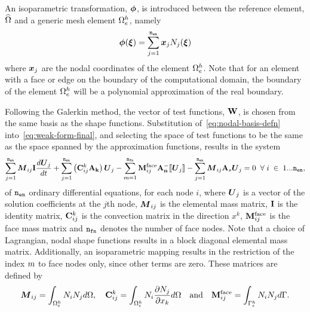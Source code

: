 An isoparametric transformation, $\boldsymbol{\phi}$, is introduced between the reference element, $\widehat{\Omega}$ and a generic mesh element $\Omega_e^{h}$, namely
\begin{equation} \label{eq:isoparametricMapping}
\boldsymbol{\phi}(\boldsymbol{\xi}) = \sum_{j=1}^{\texttt{n}_{\texttt{en}}} \boldsymbol{x}_j N_j(\boldsymbol{\xi})
\end{equation}
where $\boldsymbol{x}_j$ are the nodal coordinates of the element $\Omega_e^{h}$. Note that for an element with a face or edge on the boundary of the computational domain, the boundary of the element $\Omega_e^{h}$ will be a polynomial approximation of the real boundary\cite{ComparisonCurvedFEs}.

 Following the Galerkin method, the vector of test functions, $\mathbf{W}$, is chosen from the same basis as the shape functions. Substitution of~\eqref{eq:nodal-basis-defn} into~\eqref{eq:weak-form-final}, and selecting the space of test functions to be the same as the space spanned by the approximation functions, results in the system
 \begin{equation}
\sum_{j=1}^{\texttt{n}_{\texttt{en}}} \boldsymbol{M}_{ij} \mathbf{I} \frac{d \boldsymbol{U}_j}{d t} + \sum_{j=1}^{\texttt{n}_{\texttt{en}}} \left( \mathbf{C}^{k}_{ij} \mathbf{A}_\mathbf{k} \right) \boldsymbol{U}_j - \sum_{m=1}^{\texttt{n}_{\texttt{fn}}} \mathbf{M}^{\textrm{face}}_{ij} \mathbf{A}_\mathbf{n}^{-} \llbracket \boldsymbol{U}_j \rrbracket - \sum_{j=1}^{\texttt{n}_{\texttt{en}}} \boldsymbol{M}_{ij} \mathbf{A}_s \boldsymbol{U}_j = 0 \; \; \forall \; i \; \in \; 1...\texttt{n}_{\texttt{en}},
\label{eq:discretised-weak-form-fem}
\end{equation}
of $\texttt{n}_{\texttt{en}}$ ordinary differential equations, for each node $i$, where $\boldsymbol{U}_j$ is a vector of the solution coefficients at the $j$th node, $\boldsymbol{M}_{ij}$ is the elemental mass matrix, $\mathbf{I}$ is the identity matrix, $\mathbf{C}^{k}_{ij}$ is the convection matrix in the direction $x^{k}$, $\mathbf{M}^{\textrm{face}}_{ij}$ is the face mass matrix and $\texttt{n}_{\texttt{fn}}$ denotes the number of face nodes. Note that a choice of Lagrangian, nodal shape functions results in a block diagonal elemental mass matrix. Additionally, an isoparametric mapping results in the restriction of the index $m$ to face nodes only, since other terms are zero. These matrices are defined by
\begin{equation}
\boldsymbol{M}_{ij} = \int_{\Omega_e^{h}} N_i N_j d\Omega, \quad
\mathbf{C}^{k}_{ij} = \int_{\Omega_e^{h}} N_i \frac{\partial N_j}{\partial x_k}d\Omega \quad \text{and} \quad
\mathbf{M}^{\textrm{face}}_{ij} = \int_{\Gamma^{h}_e} N_i N_j d\Gamma .
\end{equation}
